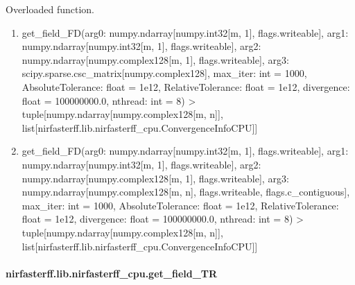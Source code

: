 \documentclass[letterpaper,10pt,english]{sphinxmanual}
\begin{document}
\begin{fulllineitems}
\label{\detokenize{_autosummary/nirfasterff.lib.nirfasterff_cpu.get_field_FD:nirfasterff.lib.nirfasterff_cpu.get_field_FD}}
\pysigstartsignatures
{}
\pysigstopsignatures
\sphinxAtStartPar
Overloaded function.
\begin{enumerate}
%
\item {} 
\sphinxAtStartPar
get\_field\_FD(arg0: numpy.ndarray{[}numpy.int32{[}m, 1{]}, flags.writeable{]}, arg1: numpy.ndarray{[}numpy.int32{[}m, 1{]}, flags.writeable{]}, arg2: numpy.ndarray{[}numpy.complex128{[}m, 1{]}, flags.writeable{]}, arg3: scipy.sparse.csc\_matrix{[}numpy.complex128{]}, max\_iter: int = 1000, AbsoluteTolerance: float = 1e\sphinxhyphen{}12, RelativeTolerance: float = 1e\sphinxhyphen{}12, divergence: float = 100000000.0, nthread: int = 8) \sphinxhyphen{}\textgreater{} tuple{[}numpy.ndarray{[}numpy.complex128{[}m, n{]}{]}, list{[}nirfasterff.lib.nirfasterff\_cpu.ConvergenceInfoCPU{]}{]}

\item {} 
\sphinxAtStartPar
get\_field\_FD(arg0: numpy.ndarray{[}numpy.int32{[}m, 1{]}, flags.writeable{]}, arg1: numpy.ndarray{[}numpy.int32{[}m, 1{]}, flags.writeable{]}, arg2: numpy.ndarray{[}numpy.complex128{[}m, 1{]}, flags.writeable{]}, arg3: numpy.ndarray{[}numpy.complex128{[}m, n{]}, flags.writeable, flags.c\_contiguous{]}, max\_iter: int = 1000, AbsoluteTolerance: float = 1e\sphinxhyphen{}12, RelativeTolerance: float = 1e\sphinxhyphen{}12, divergence: float = 100000000.0, nthread: int = 8) \sphinxhyphen{}\textgreater{} tuple{[}numpy.ndarray{[}numpy.complex128{[}m, n{]}{]}, list{[}nirfasterff.lib.nirfasterff\_cpu.ConvergenceInfoCPU{]}{]}

\end{enumerate}

\end{fulllineitems}


\sphinxstepscope


\paragraph{nirfasterff.lib.nirfasterff\_cpu.get\_field\_TR}
\label{\detokenize{_autosummary/nirfasterff.lib.nirfasterff_cpu.get_field_TR:nirfasterff-lib-nirfasterff-cpu-get-field-tr}}\label{\detokenize{_autosummary/nirfasterff.lib.nirfasterff_cpu.get_field_TR::doc}}
\end{document}
